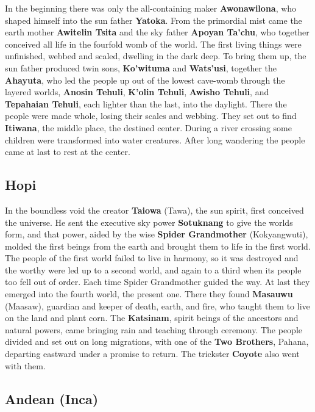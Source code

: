 In the beginning there was only the all-containing maker \textbf{Awonawilona}, who shaped himself into the sun father \textbf{Yatoka}. From the primordial mist came the earth mother \textbf{Awitelin Tsita} and the sky father \textbf{Apoyan Ta'chu}, who together conceived all life in the fourfold womb of the world. The first living things were unfinished, webbed and scaled, dwelling in the dark deep. To bring them up, the sun father produced twin sons, \textbf{Ko'wituma} and \textbf{Wats'usi}, together the \textbf{Ahayuta}, who led the people up out of the lowest cave-womb through the layered worlds, \textbf{Anosin Tehuli}, \textbf{K'olin Tehuli}, \textbf{Awisho Tehuli}, and \textbf{Tepahaian Tehuli}, each lighter than the last, into the daylight. There the people were made whole, losing their scales and webbing. They set out to find \textbf{Itiwana}, the middle place, the destined center. During a river crossing some children were transformed into water creatures. After long wandering the people came at last to rest at the center.

\subsection{Hopi}

In the boundless void the creator \textbf{Taiowa} (Tawa), the sun spirit, first conceived the universe. He sent the executive sky power \textbf{Sotuknang} to give the worlds form, and that power, aided by the wise \textbf{Spider Grandmother} (Kokyangwuti), molded the first beings from the earth and brought them to life in the first world. The people of the first world failed to live in harmony, so it was destroyed and the worthy were led up to a second world, and again to a third when its people too fell out of order. Each time Spider Grandmother guided the way. At last they emerged into the fourth world, the present one. There they found \textbf{Masauwu} (Maasaw), guardian and keeper of death, earth, and fire, who taught them to live on the land and plant corn. The \textbf{Katsinam}, spirit beings of the ancestors and natural powers, came bringing rain and teaching through ceremony. The people divided and set out on long migrations, with one of the \textbf{Two Brothers}, Pahana, departing eastward under a promise to return. The trickster \textbf{Coyote} also went with them.

\subsection{Andean (Inca)}

